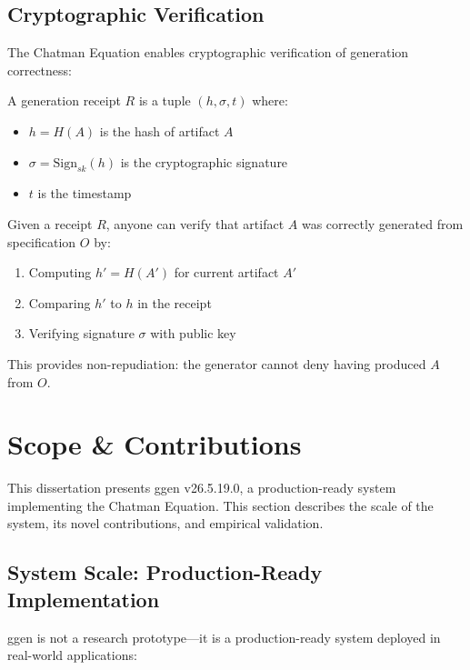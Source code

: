 \subsection{Cryptographic Verification}

The Chatman Equation enables cryptographic verification of generation correctness:

\begin{definition}
    A generation receipt \(R\) is a tuple \((h, \sigma, t)\) where:
    \begin{itemize}
        \item \(h = H(A)\) is the hash of artifact \(A\)
        \item \(\sigma = \text{Sign}_{sk}(h)\) is the cryptographic signature
        \item \(t\) is the timestamp
    \end{itemize}
\end{definition}

Given a receipt \(R\), anyone can verify that artifact \(A\) was correctly generated from specification \(O\) by:
\begin{enumerate}
    \item Computing \(h' = H(A')\) for current artifact \(A'\)
    \item Comparing \(h'\) to \(h\) in the receipt
    \item Verifying signature \(\sigma\) with public key
\end{enumerate}

This provides non-repudiation: the generator cannot deny having produced \(A\) from \(O\).

\section{Scope \& Contributions}

This dissertation presents ggen v26.5.19.0, a production-ready system implementing the Chatman Equation. This section describes the scale of the system, its novel contributions, and empirical validation.

\subsection{System Scale: Production-Ready Implementation}

ggen is not a research prototype---it is a production-ready system deployed in real-world applications:

